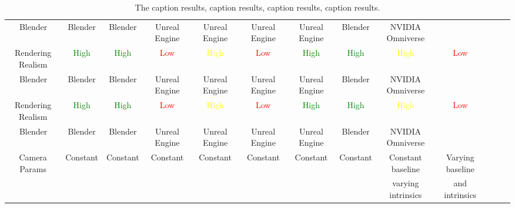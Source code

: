 \documentclass[letterpaper]{article} %
\begin{document}
\begin{table*}[ht!]
{\begin{tabular}{clcc ccc ccc ccc c}
\rowcolor{gray!20}\multicolumn{2}{c}{Simulator}&Blender&Blender&Blender&Unreal Engine&Unreal Engine&Unreal Engine&Unreal Engine&Blender&NVIDIA Omniverse\\
\multicolumn{2}{c}{Rendering Realism}&\textcolor{green}{High}&\textcolor{green}{High}&\textcolor{red}{Low}&\textcolor{Yellow}{High}&\textcolor{red}{Low}&\textcolor{green}{High}&\textcolor{green}{High}&\textcolor{Yellow}{High}&\textcolor{red}{Low}\\
\rowcolor{gray!20}\multicolumn{2}{c}{Simulator}&Blender&Blender&Blender&Unreal Engine&Unreal Engine&Unreal Engine&Unreal Engine&Blender&NVIDIA Omniverse\\
\multicolumn{2}{c}{Rendering Realism}&\textcolor{green}{High}&\textcolor{green}{High}&\textcolor{red}{Low}&\textcolor{Yellow}{High}&\textcolor{red}{Low}&\textcolor{green}{High}&\textcolor{green}{High}&\textcolor{Yellow}{High}&\textcolor{red}{Low}\\
\rowcolor{gray!20}\multicolumn{2}{c}{Simulator}&Blender&Blender&Blender&Unreal Engine&Unreal Engine&Unreal Engine&Unreal Engine&Blender&NVIDIA Omniverse\\
\multicolumn{2}{c}{\multirow{2}{*}{Camera Params}}&\multirow{2}{*}{Constant}&\multirow{2}{*}{Constant}&\multirow{2}{*}{Constant}&\multirow{2}{*}{Constant}&\multirow{2}{*}{Constant}&\multirow{2}{*}{Constant}&\multirow{2}{*}{Constant}&Constant baseline&Varying baseline\\
&&&&&&&&&varying intrinsics&and intrinsics\\
             \bottomrule
       \end{tabular}
   }
   \caption{The caption results, caption results, caption results, caption results.}
\end{table*}
\end{document}
